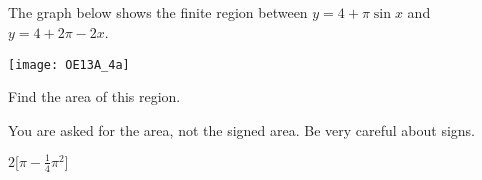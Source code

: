 







\subsection*{\Application}

\begin{Mquestion}[2013A]\label{prob_s1.5q5}
The graph below shows the finite region between
$y = 4 + \pi \sin x$ and $y = 4 + 2\pi - 2x$.

\begin{center}
       \texttt{[image: OE13A\_4a]}
\end{center}

\noindent Find the area of this region.
\end{Mquestion}

\begin{hint}
You are asked for the area, not the signed area. Be very careful about signs.
\end{hint}

\begin{answer}
$2\Big[\pi-\frac{1}{4}\pi^2\Big]$
\end{answer}

